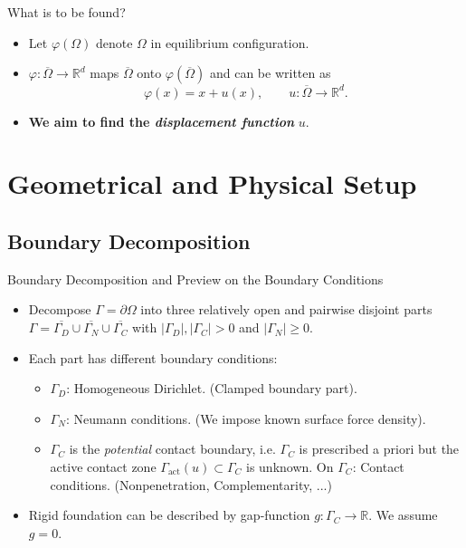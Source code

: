 \documentclass[10pt,aspectratio=169]{beamer}
\def\R{{\mathbb R}}
\begin{document}
\begin{frame}{What is to be found?}
	\begin{itemize}
		\item Let $\varphi(\Omega)$ denote $\Omega$ in equilibrium configuration.
		\item $\varphi:\overline{\Omega}\to\R^d$ maps $\overline{\Omega}$ onto $\varphi(\overline{\Omega})$ and can be written as
		      \begin{equation*}
			      \varphi(x) = x+ u(x),\qquad u:\overline{\Omega}\to\R^d.
		      \end{equation*}
		\item {\bf We aim to find the {\em displacement function}} $u$.
	\end{itemize}
	\begin{figure}[!h]
		\centering
		
	\end{figure}
\end{frame}

\section{Geometrical and Physical Setup}

\subsection{Boundary Decomposition}

\begin{frame}{Boundary Decomposition and Preview on the Boundary Conditions}
	\begin{itemize}
		\item Decompose $\Gamma = \partial\Omega$ into three relatively open and pairwise disjoint parts $\Gamma = \overline{\Gamma_D}\cup\overline{\Gamma_N}\cup\overline{\Gamma_C}$ with $|\Gamma_D|,|\Gamma_C|>0$ and $|\Gamma_N|\ge 0$.
		\item Each part has different boundary conditions:
		      \begin{itemize}
			      \item $\Gamma_D$: Homogeneous Dirichlet. (Clamped boundary part).
			      \item $\Gamma_N$: Neumann conditions. (We impose known surface force density).
			      \item $\Gamma_C$ is the {\em potential} contact boundary, i.e. $\Gamma_C$ is prescribed a priori but the active contact zone $\Gamma_{\mathrm{act}}(u)\subset\Gamma_C$ is unknown. On $\Gamma_C$: Contact conditions. (Nonpenetration, Complementarity, ...)
		      \end{itemize}
		\item Rigid foundation can be described by gap-function $g:\Gamma_C\to\R$. We assume $g = 0$.
	\end{itemize}
	\begin{figure}[!h]
		\centering
		
	\end{figure}
\end{frame}
\end{document}
